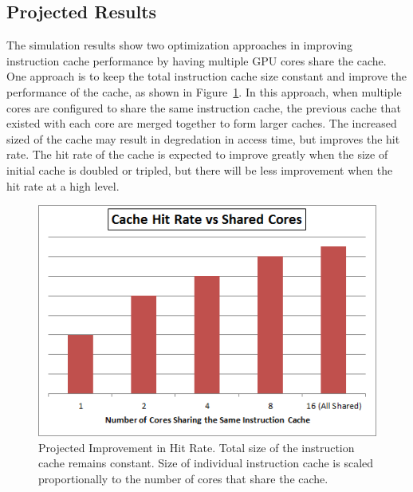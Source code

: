 \subsection{Projected Results}

The simulation results show two optimization
approaches in improving instruction cache performance by having
multiple GPU cores share the cache. 
One approach is to keep the total instruction cache size constant and
improve the performance of the cache, as shown in
Figure~\ref{HitImprov}. 
In this approach, when multiple cores are configured to share the same
instruction cache, the previous cache that existed with each core are
merged together to form larger caches. 
The increased sized of the cache may result in degredation in access
time, but improves the hit rate. 
The hit rate of the cache is expected to improve greatly when the size
of initial cache is doubled or tripled, but there will be less
improvement when the hit rate at a high level.


\begin{figure}[t]
\centering
\includegraphics[width=\columnwidth]{graphics/HitRateImprov.png}
\caption{Projected Improvement in Hit Rate. Total size of the instruction cache remains constant. Size of individual instruction cache is scaled proportionally to the number of cores that share the cache.}
\label{HitImprov}
\end{figure}


